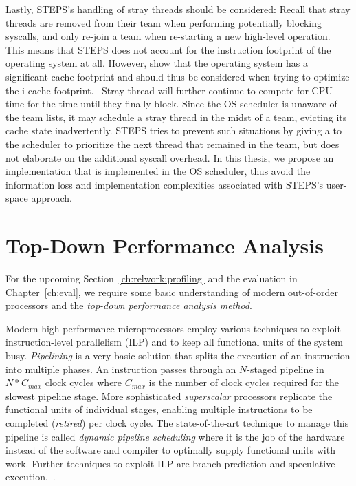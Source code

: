 \documentclass[12pt,a4paper]{book}
\begin{document}
Lastly, STEPS's handling of stray threads should be considered:
Recall that stray threads are removed from their team when performing potentially blocking syscalls, and only re-join a team when re-starting a new high-level operation.~\cite{steps}
This means that STEPS does not account for the instruction footprint of the operating system at all.
However, \citeauthor*{osCacheFootprint} show that the operating system has a significant cache footprint and should thus be considered when trying to optimize the i-cache footprint.~\cite{osCacheFootprint,compspr} %
Stray thread will further continue to compete for CPU time for the time until they finally block.
Since the OS scheduler is unaware of the team lists, it may schedule a stray thread in the midst of a team, evicting its cache state inadvertently.
STEPS tries to prevent such situations by giving a  to the scheduler to prioritize the next thread that remained in the team, but does not elaborate on the additional syscall overhead.
In this thesis, we propose an implementation that is implemented in the OS scheduler, thus avoid the information loss and implementation complexities associated with STEPS's user-space approach.

\section{Top-Down Performance Analysis}\label{ch:relwork:topdown}
For the upcoming Section~\ref{ch:relwork:profiling} and the evaluation in Chapter~\ref{ch:eval}, we require some basic understanding of modern out-of-order processors and the \emph{top-down performance analysis method}.

Modern high-performance microprocessors employ various techniques to exploit instruction-level parallelism (ILP) and to keep all functional units of the system busy.
\emph{Pipelining} is a very basic solution that splits the execution of an instruction into multiple phases. An instruction passes through an $N$-staged pipeline in $N * C_{max}$ clock cycles where $C_{max}$ is the number of clock cycles required for the slowest pipeline stage.
More sophisticated \emph{superscalar} processors replicate the functional units of individual stages, enabling multiple instructions to be completed (\emph{retired}) per clock cycle.
The state-of-the-art technique to manage this pipeline is called \emph{dynamic pipeline scheduling} where it is the job of the hardware instead of the software and compiler to optimally supply functional units with work.
Further techniques to exploit ILP are branch prediction and speculative execution.~\cite{hennessy2002DynamicPipeline}.
\end{document}
